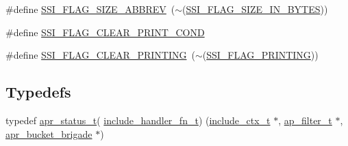 \begin{DoxyCompactItemize}
\item 
\#define \hyperlink{group__MOD__INCLUDE_ga4e59201bd64a293cb882d75ed1ed85b0}{S\+S\+I\+\_\+\+F\+L\+A\+G\+\_\+\+S\+I\+Z\+E\+\_\+\+A\+B\+B\+R\+EV}~($\sim$(\hyperlink{group__MOD__INCLUDE_gaf3c30794f5eeba35a248670c5172f92f}{S\+S\+I\+\_\+\+F\+L\+A\+G\+\_\+\+S\+I\+Z\+E\+\_\+\+I\+N\+\_\+\+B\+Y\+T\+ES}))
\item 
\#define \hyperlink{group__MOD__INCLUDE_ga173b3a55e79c6e2754d35df2d076e409}{S\+S\+I\+\_\+\+F\+L\+A\+G\+\_\+\+C\+L\+E\+A\+R\+\_\+\+P\+R\+I\+N\+T\+\_\+\+C\+O\+ND}
\item 
\#define \hyperlink{group__MOD__INCLUDE_ga0612f22300616dfbb16427474e6ff7aa}{S\+S\+I\+\_\+\+F\+L\+A\+G\+\_\+\+C\+L\+E\+A\+R\+\_\+\+P\+R\+I\+N\+T\+I\+NG}~($\sim$(\hyperlink{group__MOD__INCLUDE_ga1af16fe6177d853075fe19cdaa3b6952}{S\+S\+I\+\_\+\+F\+L\+A\+G\+\_\+\+P\+R\+I\+N\+T\+I\+NG}))
\end{DoxyCompactItemize}
\subsection*{Typedefs}
\begin{DoxyCompactItemize}
\item 
typedef \hyperlink{group__apr__errno_gaa5105fa83cc322f09382292db8b47593}{apr\+\_\+status\+\_\+t}( \hyperlink{group__MOD__INCLUDE_ga9f4b1b811067b96814b28e9e800d55dc}{include\+\_\+handler\+\_\+fn\+\_\+t}) (\hyperlink{structinclude__ctx__t}{include\+\_\+ctx\+\_\+t} $\ast$, \hyperlink{structap__filter__t}{ap\+\_\+filter\+\_\+t} $\ast$, \hyperlink{structapr__bucket__brigade}{apr\+\_\+bucket\+\_\+brigade} $\ast$)
\end{DoxyCompactItemize}

